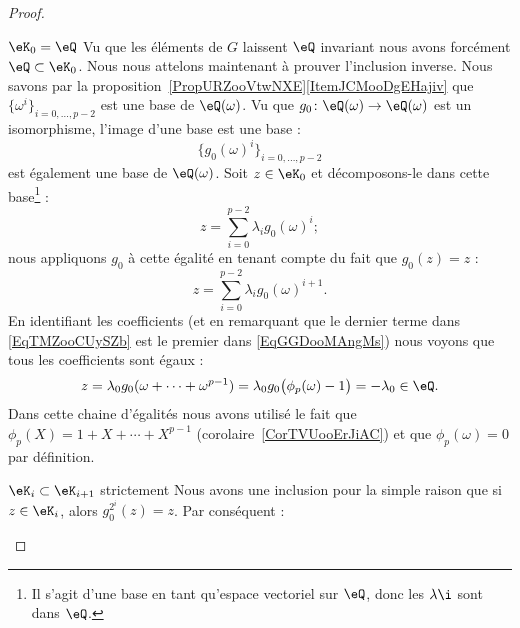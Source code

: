 \begin{proof}
\begin{subproof}
\begin{subproof}
                \item[\( \eK_0=\eQ\)]
                    Vu que les éléments de \( G\) laissent \( \eQ\) invariant nous avons forcément \( \eQ\subset \eK_0\). Nous nous attelons maintenant à prouver l'inclusion inverse. Nous savons par la proposition~\ref{PropURZooVtwNXE}\ref{ItemJCMooDgEHajiv} que \( \{ \omega^i \}_{i=0,\ldots, p-2}\) est une base de \( \eQ(\omega)\). Vu que \( g_0\colon \eQ(\omega)\to \eQ(\omega)\) est un isomorphisme, l'image d'une base est une base :
                    \begin{equation}
                        \{ g_0(\omega)^i \}_{i=0,\ldots, p-2}
                    \end{equation}
                    est également une base de \( \eQ(\omega)\). Soit \( z\in \eK_0\) et décomposons-le dans cette base\footnote{Il s'agit d'une base en tant qu'espace vectoriel sur \( \eQ\), donc les \( \lambda\i\) sont dans \( \eQ\).} :
                    \begin{equation}    \label{EqTMZooCUySZb}
                        z=\sum_{i=0}^{p-2}\lambda_i g_0(\omega)^i;
                    \end{equation}
                    nous appliquons \( g_0\) à cette égalité en tenant compte du fait que \( g_0(z)=z\) :
                    \begin{equation}    \label{EqGGDooMAngMs}
                        z=\sum_{i=0}^{p-2}\lambda_ig_0(\omega)^{i+1}.
                    \end{equation}
                    En identifiant les coefficients (et en remarquant que le dernier terme dans \eqref{EqTMZooCUySZb} est le premier dans \eqref{EqGGDooMAngMs}) nous voyons que tous les coefficients sont égaux :
                    \begin{equation}
                        z=\lambda_0g_0(\omega+\cdots +\omega^{p-1})=\lambda_0g_0\big( \phi_p(\omega)-1 \big)=-\lambda_0\in \eQ.
                    \end{equation}
                    Dans cette chaine d'égalités nous avons utilisé le fait que \( \phi_p(X)=1+X+\cdots +X^{p-1}\) (corolaire~\ref{CorTVUooErJiAC}) et que \( \phi_p(\omega)=0\) par définition.
                    \item[\( \eK_i\subset \eK_{i+1}\) strictement]
                        Nous avons une inclusion pour la simple raison que si \( z\in \eK_i\), alors \( g_0^{2^i}(z)=z\). Par conséquent :

\end{subproof}
\end{subproof}
\end{proof}
